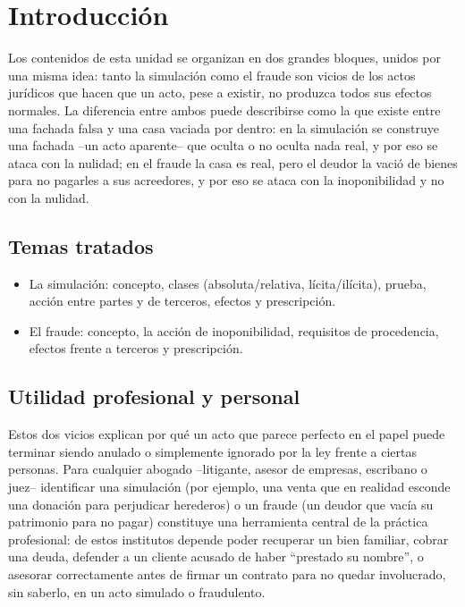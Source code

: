 \documentclass[12pt,oneside]{book}
\begin{document}
\tableofcontents

\chapter*{Introducción}

Los contenidos de esta unidad se organizan en dos grandes bloques, unidos por una misma idea: tanto la simulación como el fraude son vicios de los actos jurídicos que hacen que un acto, pese a existir, no produzca todos sus efectos normales. La diferencia entre ambos puede describirse como la que existe entre una fachada falsa y una casa vaciada por dentro: en la simulación se construye una fachada --un acto aparente-- que oculta o no oculta nada real, y por eso se ataca con la nulidad; en el fraude la casa es real, pero el deudor la vació de bienes para no pagarles a sus acreedores, y por eso se ataca con la inoponibilidad y no con la nulidad.

\section*{Temas tratados}

\begin{itemize}
    \item La simulación: concepto, clases (absoluta/relativa, lícita/ilícita), prueba, acción entre partes y de terceros, efectos y prescripción.
    \item El fraude: concepto, la acción de inoponibilidad, requisitos de procedencia, efectos frente a terceros y prescripción.
\end{itemize}

\section*{Utilidad profesional y personal}

Estos dos vicios explican por qué un acto que parece perfecto en el papel puede terminar siendo anulado o simplemente ignorado por la ley frente a ciertas personas. Para cualquier abogado --litigante, asesor de empresas, escribano o juez-- identificar una simulación (por ejemplo, una venta que en realidad esconde una donación para perjudicar herederos) o un fraude (un deudor que vacía su patrimonio para no pagar) constituye una herramienta central de la práctica profesional: de estos institutos depende poder recuperar un bien familiar, cobrar una deuda, defender a un cliente acusado de haber ``prestado su nombre'', o asesorar correctamente antes de firmar un contrato para no quedar involucrado, sin saberlo, en un acto simulado o fraudulento.
\end{document}
